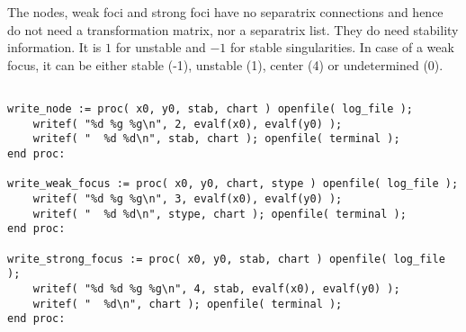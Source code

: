 \documentclass[a4paper,10pt]{article}
\begin{document}
The nodes, weak foci and strong foci have no separatrix connections and hence do not need a transformation matrix, nor a separatrix list.  They do need stability information.
It is $1$ for unstable and $-1$ for stable singularities.  In case of a weak focus, it can be either stable (-1), unstable (1), center  (4) or undetermined (0).

\begin{lstlisting}[name=writelog]

write_node := proc( x0, y0, stab, chart ) openfile( log_file );
    writef( "%d %g %g\n", 2, evalf(x0), evalf(y0) );
    writef( "  %d %d\n", stab, chart ); openfile( terminal );
end proc:

write_weak_focus := proc( x0, y0, chart, stype ) openfile( log_file );
    writef( "%d %g %g\n", 3, evalf(x0), evalf(y0) );
    writef( "  %d %d\n", stype, chart ); openfile( terminal );
end proc:

write_strong_focus := proc( x0, y0, stab, chart ) openfile( log_file );
    writef( "%d %d %g %g\n", 4, stab, evalf(x0), evalf(y0) );
    writef( "  %d\n", chart ); openfile( terminal );
end proc:

\end{lstlisting}
\end{document}
